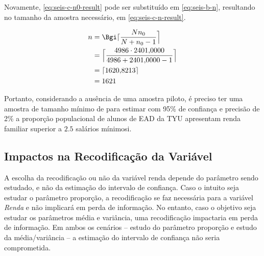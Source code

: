 	Novamente, \eqref{eq:seis-c-n0-result} pode ser substituído em
	\eqref{eq:seis-b-n}, resultando no tamanho da amostra necessário, em
	\eqref{eq:seis-c-n-result}.

	\begin{align}
		n &= \Bgi\lceil \frac{N n_0}{N + n_0 - 1} \nonumber \Big\rceil \\
		  &= \Big\lceil \frac{\SEISN \cdot \SEISCnz}{\SEISN + \SEISCnz - 1} \Big\rceil \nonumber \\
		  &= \lceil \SEISCn \rceil \nonumber \\
		  &= \label{eq:seis-c-n-result} 
			 \SEISCnceil
	\end{align}

	Portanto, considerando a ausência de uma amostra piloto, é preciso ter uma
	amostra de tamanho mínimo de \SEISCnceil para estimar com 95\% de
	confiança e precisão de 2\% a proporção populacional de alunos de EAD da TYU
	apresentam renda familiar superior a $\num{2,5}$ salários mínimosi.

\subsection{Impactos na Recodificação da Variável}

	A escolha da recodificação ou não da variável renda depende do parâmetro
	sendo estudado, e não da estimação do intervalo de confiança. Caso o
	intuito seja estudar o parâmetro proporção, a recodificação se faz
	necessária para a variável \textit{Renda} e não implicará em perda de
	informação.  No entanto, caso o objetivo seja estudar os parâmetros
	média e variância, uma recodificação impactaria em perda de informação.
	Em ambos os cenários -- estudo do parâmetro proporção e estudo da
	média/variância -- a estimação do intervalo de confiança não seria
	comprometida.
